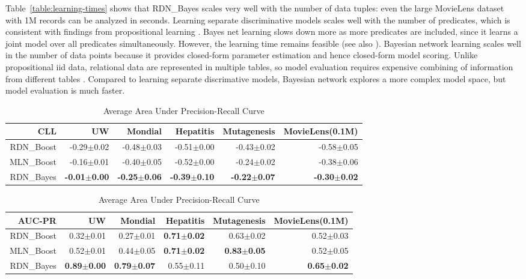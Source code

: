 \documentclass[runningheads,a4paper]{llncs}
\begin{document}
Table~\ref{table:learning-times} shows that RDN\_Bayes scales very well with the number of data tuples: even the large MovieLens dataset with 1M records can be analyzed in seconds. Learning separate discriminative models  scales well with the number of predicates, which is consistent with findings from  propositional learning \cite{Heckerman2000}. Bayes net learning slows down more as more predicates are included, since it learns a joint model over all predicates simultaneously. However, the learning time remains feasible (see also \cite{Schulte2012}). Bayesian network learning scales well in the number of data points because it provides closed-form parameter estimation and hence closed-form model scoring. Unlike propositional iid data, relational data are represented in multiple tables, so model evaluation requires expensive combining of information from different tables \cite{Neville2007}. Compared to learning separate discrimative models, Bayesian network explores a more complex model space, but  model evaluation is much faster. 
\begin{table}[htbp]
 \centering
  \caption{Average Conditional Log-Likelihood}
    \begin{tabular}{|r|r|r|r|r|r|} \hline
    \textbf{CLL} & UW    & Mondial  & Hepatitis & Mutagenesis  & MovieLens(0.1M) \\ \hline
   RDN\_Boost & -0.29$\pm$0.02 & -0.48$\pm$0.03 & -0.51$\pm$0.00 & -0.43$\pm$0.02 & -0.58$\pm$0.05 \\
    MLN\_Boost & -0.16$\pm$0.01 & -0.40$\pm$0.05 & -0.52$\pm$0.00 & -0.24$\pm$0.02 & -0.38$\pm$0.06 \\
    RDN\_Bayes & \textbf{-0.01$\pm$0.00} & \textbf{-0.25$\pm$0.06} & \textbf{-0.39$\pm$0.10} & \textbf{-0.22$\pm$0.07} & \textbf{-0.30$\pm$0.02} \\ \hline
    \end{tabular}%
  \label{table:cll}%

 \centering 
 \vspace{0.1cm}
 \caption{Average Area Under Precision-Recall Curve}
    \begin{tabular}{|r|r|r|r|r|r|} \hline
    \textbf{AUC-PR} & UW    & Mondial  & Hepatitis & Mutagenesis  & MovieLens(0.1M) \\ \hline
    RDN\_Boost & 0.32$\pm$0.01 & 0.27$\pm$0.01 & \textbf{0.71$\pm$0.02} & 0.63$\pm$0.02 & 0.52$\pm$0.03 \\
    MLN\_Boost & 0.52$\pm$0.01 & 0.44$\pm$0.05 & \textbf{0.71$\pm$0.02} & \textbf{0.83$\pm$0.05} & 0.52$\pm$0.05 \\
    RDN\_Bayes & \textbf{0.89$\pm$0.00} & \textbf{0.79$\pm$0.07} & 0.55$\pm$0.11 & 0.50$\pm$0.10 & \textbf{0.65$\pm$0.02} \\ \hline
    \end{tabular}%
  \label{table:AUC}%
\end{table}%
\end{document}
